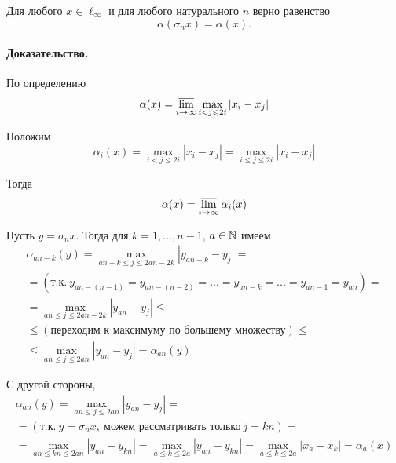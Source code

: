 \begin{theorem}
	\label{thm:alpha_sigma_n}
	Для любого $x\in\ell_\infty$ и для любого натурального $n$ верно равенство
	\begin{equation}
		\alpha(\sigma_n x) = \alpha(x)
		.
	\end{equation}
\end{theorem}

\paragraph{Доказательство.}
По определению
\begin{equation}
	\alpha(x) = \varlimsup_{i\to\infty} \max_{i<j\leqslant 2i} |x_i - x_j|
\end{equation}

Положим
\begin{equation}
	\alpha_i(x) =
	\max_{i<j\leqslant 2i} |x_i - x_j| =
	\max_{i\leqslant j\leqslant 2i} |x_i - x_j|
\end{equation}

Тогда
\begin{equation}
	\alpha(x) = \varlimsup_{i\to\infty} \alpha_i(x)
\end{equation}

Пусть $y = \sigma_n x$.
Тогда для $k=1, ..., n-1$, $a\in\mathbb{N}$ имеем
\begin{multline}
	\alpha_{an-k}(y) =
	\max_{an-k \leqslant j \leqslant 2an-2k} |y_{an-k} - y_j| =
	\\=
	(\mbox{т.к.}~y_{an-(n-1)}=y_{an-(n-2)}=...=y_{an-k}=...=y_{an-1}=y_{an})=
	\\=
	\max_{an \leqslant j \leqslant 2an-2k} |y_{an} - y_j| \leqslant
	\\ \leqslant
	(\mbox{переходим к максимуму по большему множеству}) \leqslant
	\\ \leqslant
	\max_{an \leqslant j \leqslant 2an} |y_{an} - y_j| =
	\alpha_{an}(y)
\end{multline}

С другой стороны,
\begin{multline}
	\alpha_{an}(y) =
	\max_{an \leqslant j \leqslant 2an} |y_{an} - y_j| =
	\\ =
	(\mbox{т.к.}~y=\sigma_n x,~\mbox{можем рассматривать только}~j=kn)=
	\\ =
	\max_{an \leqslant kn \leqslant 2an} |y_{an} - y_{kn}| =
	\max_{a \leqslant k \leqslant 2a} |y_{an} - y_{kn}| =
	\max_{a \leqslant k \leqslant 2a} |x_a - x_k| =
	\alpha_a(x)
\end{multline}

